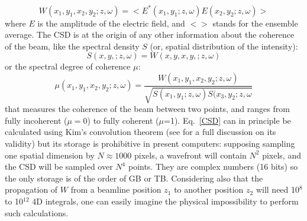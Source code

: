 \documentclass{iucr}              %
\begin{document}
\begin{equation}\label{CSD}
W(x_1,y_1,x_2,y_2;z,\omega) = <E^{*}(x_1,y_1; z,\omega) E(x_2,y_2;z,\omega)>
\end{equation}
where $E$ is the amplitude of the electric field, and $<>$ stands for the ensemble average. The CSD is at the origin of any other information about the coherence of the beam, like the spectral density $S$ (or, spatial distribution of the intensity): 
\begin{equation}\label{SD}
S(x,y,;z,\omega) = W(x,y,x,y,;z,\omega)
\end{equation}
or the spectral degree of coherence $\mu$:
\begin{equation}\label{SDC}
\mu(x_1,y_1,x_2,y_2;z,\omega) = \frac{W(x_1,y_1,x_2,y_2;z,\omega)}{\sqrt{ S(x_1,y_1;z,\omega) S(x_3,y_2;z,\omega}}
\end{equation}
that measures the coherence of the beam between two points, and ranges from fully incoherent ($\mu=0$) to fully coherent ($\mu$=1). 
Eq.~\ref{CSD} can in principle be calculated using Kim's convolution theorem \cite{kim1986} (see \cite{geloni2008} for a full discussion on its validity) but its storage is prohibitive in present computers: supposing sampling one spatial dimension by $N\approx1000$ pixels, a wavefront will contain $N^2$ pixels, and the CSD will be sampled over $N^4$ points. They are complex numbers (16 bits) so the only storage is of the order of GB or TB. Considering also that the propagation of $W$ from a beamline position $z_1$ to another position $z_2$ will need 10$^8$ to 10$^{12}$ 4D integrals, one can easily imagine the physical impossibility to perform such calculations. 
\end{document}
